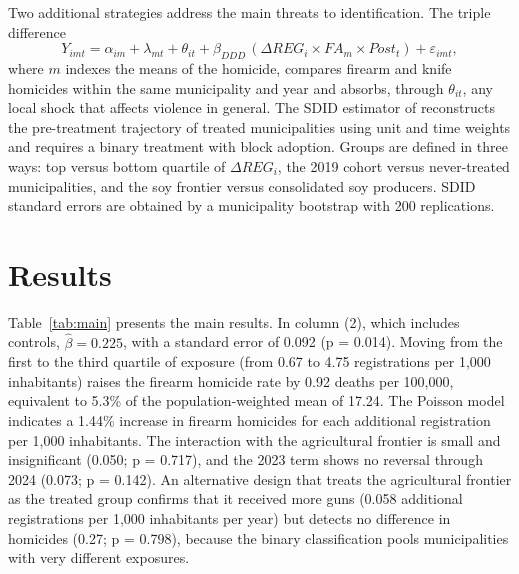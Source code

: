 \documentclass[11pt,a4paper]{article}
\begin{document}
Two additional strategies address the main threats to identification. The triple difference
\begin{equation}
Y_{imt} = \alpha_{im} + \lambda_{mt} + \theta_{it} + \beta_{DDD}\,(\Delta REG_i\times FA_m\times Post_t) + \varepsilon_{imt},
\end{equation}
where $m$ indexes the means of the homicide, compares firearm and knife homicides within the same municipality and year and absorbs, through $\theta_{it}$, any local shock that affects violence in general. The SDID estimator of \citet{arkhangelsky2021} reconstructs the pre-treatment trajectory of treated municipalities using unit and time weights and requires a binary treatment with block adoption. Groups are defined in three ways: top versus bottom quartile of $\Delta REG_i$, the 2019 cohort versus never-treated municipalities, and the soy frontier versus consolidated soy producers. SDID standard errors are obtained by a municipality bootstrap with 200 replications.

\section{Results}\label{sec:resultados}

Table~\ref{tab:main} presents the main results. In column (2), which includes controls, $\hat\beta = 0.225$, with a standard error of 0.092 (p = 0.014). Moving from the first to the third quartile of exposure (from 0.67 to 4.75 registrations per 1,000 inhabitants) raises the firearm homicide rate by 0.92 deaths per 100,000, equivalent to 5.3\% of the population-weighted mean of 17.24. The Poisson model indicates a 1.44\% increase in firearm homicides for each additional registration per 1,000 inhabitants. The interaction with the agricultural frontier is small and insignificant (0.050; p = 0.717), and the 2023 term shows no reversal through 2024 (0.073; p = 0.142). An alternative design that treats the agricultural frontier as the treated group confirms that it received more guns (0.058 additional registrations per 1,000 inhabitants per year) but detects no difference in homicides (0.27; p = 0.798), because the binary classification pools municipalities with very different exposures.
\end{document}
